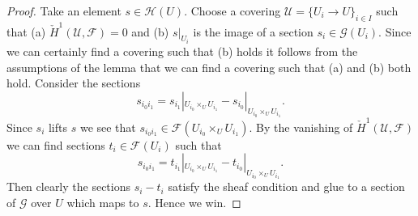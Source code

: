 \documentclass[10pt,a4paper]{amsart}
\theoremstyle{plain}
\theoremstyle{definition}
\theoremstyle{remark}
\numberwithin{equation}{subsection}
\begin{document}
\begin{proof}
Take an element $s \in \mathcal{H}(U)$. Choose a covering
$\mathcal{U} = \{U_i \to U\}_{i \in I}$ such that
(a) $\check{H}^1(\mathcal{U}, \mathcal{F}) = 0$ and (b)
$s|_{U_i}$ is the image of a section $s_i \in \mathcal{G}(U_i)$.
Since we can certainly find a covering such that (b) holds
it follows from the assumptions of the lemma that we can find
a covering such that (a) and (b) both hold.
Consider the sections
$$
s_{i_0i_1} =
s_{i_1}|_{U_{i_0} \times_U U_{i_1}} - s_{i_0}|_{U_{i_0} \times_U U_{i_1}}.
$$
Since $s_i$ lifts $s$ we see that
$s_{i_0i_1} \in \mathcal{F}(U_{i_0} \times_U U_{i_1})$.
By the vanishing of $\check{H}^1(\mathcal{U}, \mathcal{F})$ we can
find sections $t_i \in \mathcal{F}(U_i)$ such that
$$
s_{i_0i_1} =
t_{i_1}|_{U_{i_0} \times_U U_{i_1}} - t_{i_0}|_{U_{i_0} \times_U U_{i_1}}.
$$
Then clearly the sections $s_i - t_i$ satisfy the sheaf condition
and glue to a section of $\mathcal{G}$ over $U$ which maps to $s$.
Hence we win.
\end{proof}
\end{document}
